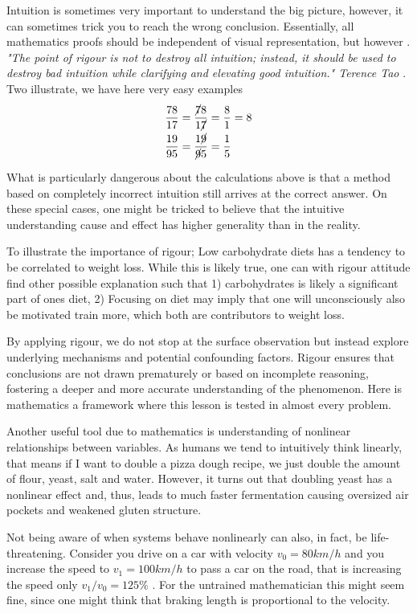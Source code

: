 \documentclass[10pt,twocolumn]{article}
\begin{document}
\begin{sloppy}
Intuition is sometimes very important to understand the big picture, however, it can sometimes trick you to reach the wrong conclusion. Essentially, all mathematics proofs should be independent of visual representation, but however . \textit{"The point of rigour is not to
destroy all intuition; instead, it should be used to destroy bad intuition while clarifying and elevating good intuition." Terence Tao }\cite{Tao2022}.
Two illustrate, we have here very easy examples \begin{align}
    \frac{78}{17}  &=  \frac{ \cancel{7}8}{ 1 \cancel{7}} = \frac{8}{1} = 8 \\
    \frac{19}{95}  &=  \frac{ 1\cancel{9}}{  \cancel{9} 5} = \frac{1}{5}
\end{align}

What is particularly dangerous about the calculations above is that a method based on completely incorrect intuition still arrives at the correct answer. On these special cases, one might be tricked to believe that the intuitive understanding cause
and effect has higher generality
than in the reality.

To illustrate the importance of rigour; Low carbohydrate diets has a tendency to be correlated to weight loss. While this is likely true, one can with rigour attitude find other possible explanation such that 1) carbohydrates is
likely a significant part of ones diet, 2) Focusing on diet may imply that one will unconsciously  also be motivated train more, which both are contributors to weight loss.

By applying rigour, we do not stop at the surface observation but instead explore underlying mechanisms and potential confounding factors. Rigour ensures that conclusions are not drawn prematurely or based on incomplete reasoning, fostering a deeper
and more accurate understanding of the phenomenon. Here is mathematics a framework where this lesson is tested in almost every problem.


Another useful tool due to mathematics is understanding of nonlinear relationships between variables. As humans we tend to intuitively think linearly, that means if I want to double a pizza dough recipe, we just double the amount of flour, yeast, salt and water. However, it turns out
that doubling yeast has a nonlinear effect and, thus, leads to much faster fermentation causing oversized air pockets and weakened gluten structure.

Not being aware of when systems behave nonlinearly can also, in fact, be life-threatening. Consider you drive on a car with velocity $ v_{0} =  80 km /h $ and you increase the speed to $v_{1} =100 km/h$ to pass a car on the road, that is increasing the
speed only $v_{1}/v_{0} = 125 \%$ . For the untrained mathematician this might
seem fine, since one might think that braking length is proportional to the velocity.


\end{sloppy}
\end{document}
